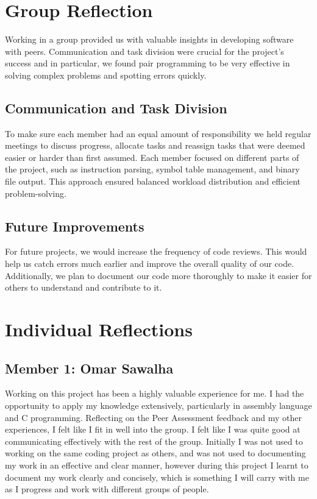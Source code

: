\documentclass[a4paper, 10pt]{article}
\begin{document}
\section{Group Reflection}
Working in a group provided us with valuable insights in developing software with peers. Communication and task division were crucial for the project's success and in particular, we found pair programming to be very effective in solving complex problems and spotting errors quickly. 

\subsection{Communication and Task Division}
To make sure each member had an equal amount of responsibility we held regular meetings to discuss progress, allocate tasks and reassign tasks that were deemed easier or harder than first assumed. Each member focused on different parts of the project, such as instruction parsing, symbol table management, and binary file output. This approach ensured balanced workload distribution and efficient problem-solving. 

\subsection{Future Improvements}
For future projects, we would increase the frequency of code reviews. This would help us catch errors much earlier and improve the overall quality of our code. Additionally, we plan to document our code more thoroughly to make it easier for others to understand and contribute to it.
\newline






\section{Individual Reflections}
\subsection{Member 1: Omar Sawalha}
Working on this project has been a highly valuable experience for me. I had the opportunity to apply my knowledge extensively, particularly in assembly language and C programming. Reflecting on the Peer Assessment feedback and my other experiences, I felt like I fit in well into the group. I felt like I was quite good at communicating effectively with the rest of the group. Initially I was not used to working on the same coding project as others, and was not used to documenting my work in an effective and clear manner, however during this project I learnt to document my work clearly and concisely, which is something I will carry with me as I progress and work with different groups of people. 
\end{document}
